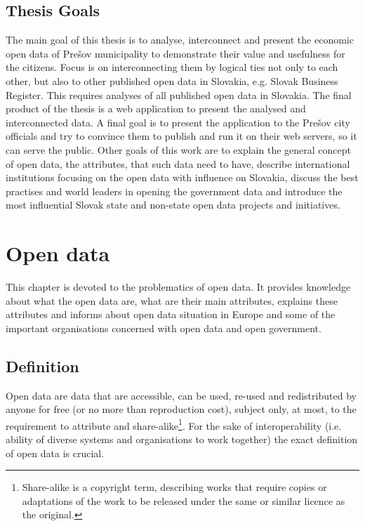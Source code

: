 \documentclass[thesis=B,english]{sprlajur-slovakopendata}[2018/05/12]
\begin{document}
\begin{introduction}
	\section*{Thesis Goals}
	The main goal of this thesis is to analyse, interconnect and present the economic open data of Prešov municipality to demonstrate their value and usefulness for the citizens. Focus is on interconnecting them by logical ties not only to each other, but also to other published open data in Slovakia, e.g. Slovak Business Register. This requires analyses of all published open data in Slovakia. The final product of the thesis is a web application to present the analysed and interconnected data. A final goal is to present the application to the Prešov city officials and try to convince them to publish and run it on their web servers, so it can serve the public. Other goals of this work are to explain the general concept of open data, the attributes, that such data need to have, describe international institutions focusing on the open data with influence on Slovakia, discuss the best practises and world leaders in opening the government data and introduce the most influential Slovak state and non-state open data projects and initiatives.
	
\end{introduction}

\chapter{Open data}
\label{opendatadefinition}
This chapter is devoted to the problematics of open data. It provides knowledge about what the open data are, what are their main attributes, explains these attributes and informs about open data situation in Europe and some of the important organisations concerned with open data and open government.
\section{Definition}
Open data are data that are accessible, can be used, re-used and redistributed by anyone for free (or no more than reproduction cost), subject only, at most, to the requirement to attribute and share-alike\footnote{Share-alike is a copyright term, describing works that require copies or adaptations of the work to be released under the same or similar licence as the original.}. For the sake of interoperability (i.e. ability of diverse systems and organisations to work together) the exact definition of open data is crucial. \cite{opendatahandbook} 
\end{document}
